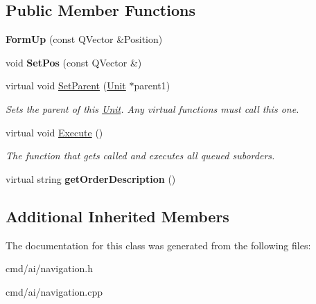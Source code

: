 \subsection*{Public Member Functions}
\begin{DoxyCompactItemize}
\item 
{\bfseries Form\+Up} (const Q\+Vector \&Position)\hypertarget{classOrders_1_1FormUp_a5de0a558db2d0faa829d9086b5bb4bf2}{}\label{classOrders_1_1FormUp_a5de0a558db2d0faa829d9086b5bb4bf2}

\item 
void {\bfseries Set\+Pos} (const Q\+Vector \&)\hypertarget{classOrders_1_1FormUp_a9034675d01ce4f4d5bc5c86ea7366a6f}{}\label{classOrders_1_1FormUp_a9034675d01ce4f4d5bc5c86ea7366a6f}

\item 
virtual void \hyperlink{classOrders_1_1FormUp_a1878c6e8bc2e314914c16ecad1333062}{Set\+Parent} (\hyperlink{classUnit}{Unit} $\ast$parent1)\hypertarget{classOrders_1_1FormUp_a1878c6e8bc2e314914c16ecad1333062}{}\label{classOrders_1_1FormUp_a1878c6e8bc2e314914c16ecad1333062}

\begin{DoxyCompactList}\small\item\em Sets the parent of this \hyperlink{classUnit}{Unit}. Any virtual functions must call this one. \end{DoxyCompactList}\item 
virtual void \hyperlink{classOrders_1_1FormUp_a11c653f8cedd81cd9aefaf92cc3f3253}{Execute} ()\hypertarget{classOrders_1_1FormUp_a11c653f8cedd81cd9aefaf92cc3f3253}{}\label{classOrders_1_1FormUp_a11c653f8cedd81cd9aefaf92cc3f3253}

\begin{DoxyCompactList}\small\item\em The function that gets called and executes all queued suborders. \end{DoxyCompactList}\item 
virtual string {\bfseries get\+Order\+Description} ()\hypertarget{classOrders_1_1FormUp_abd4c666eb24b6c11a5ac3fa25f88321d}{}\label{classOrders_1_1FormUp_abd4c666eb24b6c11a5ac3fa25f88321d}

\end{DoxyCompactItemize}
\subsection*{Additional Inherited Members}


The documentation for this class was generated from the following files\+:\begin{DoxyCompactItemize}
\item 
cmd/ai/navigation.\+h\item 
cmd/ai/navigation.\+cpp\end{DoxyCompactItemize}
